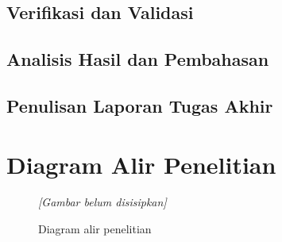         \subsection{Verifikasi dan Validasi}\label{subsec:verification}
        \subsection{Analisis Hasil dan Pembahasan}\label{subsec:analysis stage}
        \subsection{Penulisan Laporan Tugas Akhir}\label{subsec:writing}

    \section{Diagram Alir Penelitian}\label{sec:flowchart}

        \begin{figure}[H]
            \centering
            \textit{[Gambar belum disisipkan]}
            \caption{Diagram alir penelitian}\label{fig:flowchart}
        \end{figure}
